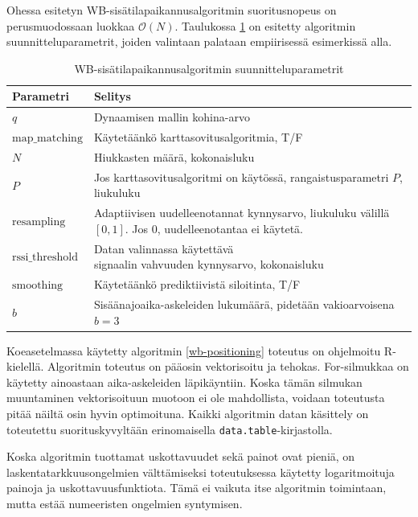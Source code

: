 \documentclass[
  12pt,
  a4paper, twoside]{book}
\begin{document}
Ohessa esitetyn WB-sisätilapaikannusalgoritmin suoritusnopeus on perusmuodossaan luokkaa \(\mathcal{O}(N)\). Taulukossa \ref{tab:wb-parametrit} on esitetty algoritmin suunnitteluparametrit, joiden valintaan palataan empiirisessä esimerkissä alla.

\begin{table}

\caption{\label{tab:wb-parametrit}WB-sisätilapaikannusalgoritmin suunnitteluparametrit}
\centering
\begin{tabular}[t]{ll}
\toprule
Parametri & Selitys\\
\midrule
$q$ & Dynaamisen mallin kohina-arvo\\
$\text{map\_matching}$ & Käytetäänkö karttasovitusalgoritmia, T/F\\
$N$ & Hiukkasten määrä, kokonaisluku\\
$P$ & \makecell[l]{Jos karttasovitusalgoritmi on käytössä,\\ rangaistusparametri $P$, liukuluku}\\
$\text{resampling}$ & \makecell[l]{Adaptiivisen uudelleenotannat kynnysarvo,\\ liukuluku välillä $[0,1]$. Jos $0$, uudelleenotantaa ei käytetä.}\\
\addlinespace
$\text{rssi\_threshold}$ & \makecell[l]{Datan valinnassa käytettävä\\ signaalin vahvuuden kynnysarvo, kokonaisluku}\\
$\text{smoothing}$ & Käytetäänkö prediktiivistä siloitinta, T/F\\
$b$ & Sisäänajoaika-askeleiden lukumäärä, pidetään vakioarvoisena $b=3$\\
\bottomrule
\end{tabular}
\end{table}

Koeasetelmassa käytetty algoritmin \ref{wb-positioning} toteutus on ohjelmoitu R-kielellä. Algoritmin toteutus on pääosin vektorisoitu ja tehokas. For-silmukkaa on käytetty ainoastaan aika-askeleiden läpikäyntiin. Koska tämän silmukan muuntaminen vektorisoituun muotoon ei ole mahdollista, voidaan toteutusta pitää näiltä osin hyvin optimoituna. Kaikki algoritmin datan käsittely on toteutettu suorituskyvyltään erinomaisella \texttt{data.table}-kirjastolla.

Koska algoritmin tuottamat uskottavuudet sekä painot ovat pieniä, on laskentatarkkuusongelmien välttämiseksi toteutuksessa käytetty logaritmoituja painoja ja uskottavuusfunktiota. Tämä ei vaikuta itse algoritmin toimintaan, mutta estää numeeristen ongelmien syntymisen.
\end{document}
